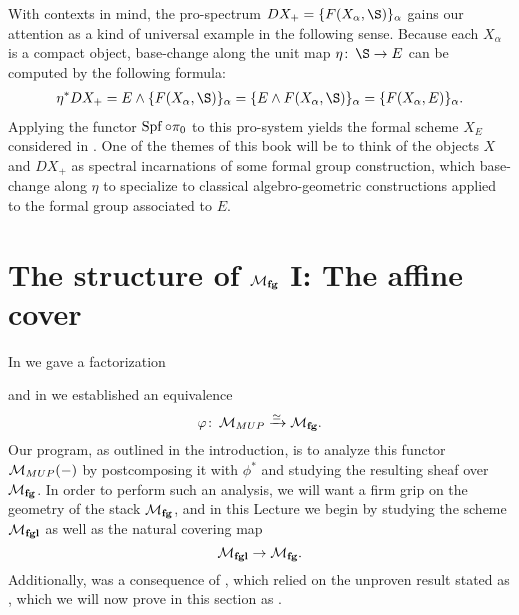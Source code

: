 \begin{remark}
With contexts in mind, the pro-spectrum $DX_+ = \{F(X_\alpha, \S)\}_\alpha$ gains our attention as a kind of universal example in the following sense.  Because each $X_\alpha$ is a compact object, base-change along the unit map $\eta\co \S \to E$ can be computed by the following formula:
\begin{align*}
\eta^* DX_+ = E \sm \{F(X_\alpha, \S)\}_\alpha = \{E \sm F(X_\alpha, \S)\}_\alpha = \{F(X_\alpha, E)\}_\alpha.
\end{align*}
Applying the functor $\operatorname{Spf} \circ \pi_0$ to this pro-system yields the formal scheme $X_E$ considered in .  One of the themes of this book will be to think of the objects $X$ and $DX_+$ as spectral incarnations of some formal group construction, which base-change along $\eta$ to specialize to classical algebro-geometric constructions applied to the formal group associated to $E$.
\end{remark}













\section{The structure of \texorpdfstring{$\mathcal{M}_{\mathbf{fg}}$}{Mfg} I: The affine cover}\label{MfgI:AffineCover}

In  we gave a factorization
\begin{center}
\end{center}
and in  we established an equivalence \[\varphi\colon\thinspace \mathcal{M}_{MUP} \xrightarrow{\simeq} \mathcal{M}_{\mathbf{fg}}.\]  Our program, as outlined in the introduction, is to analyze this functor $\mathcal{M}_{MUP}(-)$ by postcomposing it with $\phi^*$ and studying the resulting sheaf over $\mathcal{M}_{\mathbf{fg}}$.  In order to perform such an analysis, we will want a firm grip on the geometry of the stack $\mathcal{M}_{\mathbf{fg}}$, and in this Lecture we begin by studying the scheme $\mathcal{M}_{\mathbf{fgl}}$ as well as the natural covering map \[\mathcal{M}_{\mathbf{fgl}} \to \mathcal{M}_{\mathbf{fg}}.\]  Additionally,  was a consequence of , which relied on the unproven result stated as , which we will now prove in this section as .

